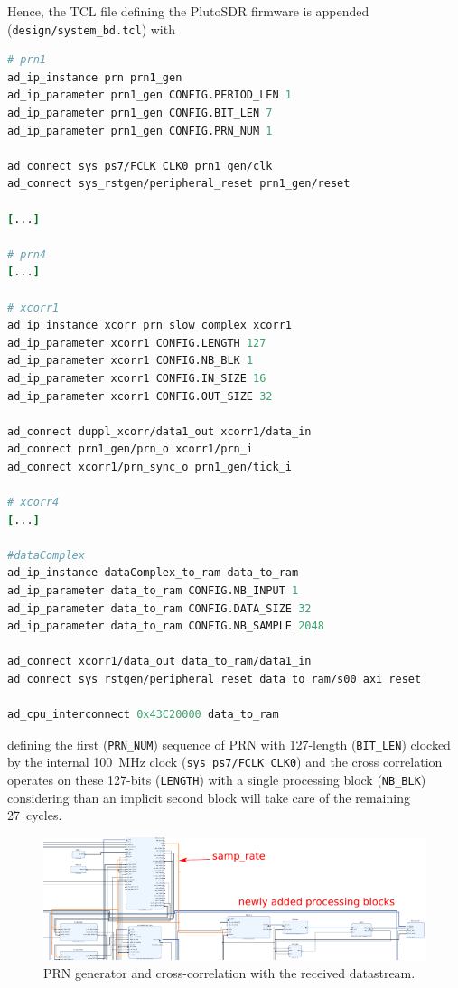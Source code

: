 \documentclass{article}
\begin{document}
Hence, the TCL file defining the PlutoSDR firmware is appended ({\tt design/system\_bd.tcl}) with
\begin{lstlisting}[language=TCL]
# prn1
ad_ip_instance prn prn1_gen
ad_ip_parameter prn1_gen CONFIG.PERIOD_LEN 1
ad_ip_parameter prn1_gen CONFIG.BIT_LEN 7
ad_ip_parameter prn1_gen CONFIG.PRN_NUM 1

ad_connect sys_ps7/FCLK_CLK0 prn1_gen/clk
ad_connect sys_rstgen/peripheral_reset prn1_gen/reset

[...]

# prn4
[...]

# xcorr1
ad_ip_instance xcorr_prn_slow_complex xcorr1
ad_ip_parameter xcorr1 CONFIG.LENGTH 127
ad_ip_parameter xcorr1 CONFIG.NB_BLK 1
ad_ip_parameter xcorr1 CONFIG.IN_SIZE 16
ad_ip_parameter xcorr1 CONFIG.OUT_SIZE 32

ad_connect duppl_xcorr/data1_out xcorr1/data_in
ad_connect prn1_gen/prn_o xcorr1/prn_i
ad_connect xcorr1/prn_sync_o prn1_gen/tick_i

# xcorr4
[...]

#dataComplex
ad_ip_instance dataComplex_to_ram data_to_ram
ad_ip_parameter data_to_ram CONFIG.NB_INPUT 1
ad_ip_parameter data_to_ram CONFIG.DATA_SIZE 32
ad_ip_parameter data_to_ram CONFIG.NB_SAMPLE 2048

ad_connect xcorr1/data_out data_to_ram/data1_in
ad_connect sys_rstgen/peripheral_reset data_to_ram/s00_axi_reset

ad_cpu_interconnect 0x43C20000 data_to_ram
\end{lstlisting}
defining the first ({\tt PRN\_NUM}) sequence of PRN with 127-length ({\tt BIT\_LEN}) clocked
by the internal 100~MHz clock ({\tt sys\_ps7/FCLK\_CLK0}) and the cross correlation
operates on these 127-bits ({\tt LENGTH}) with a single processing block ({\tt NB\_BLK}) considering
than an implicit second block will take care of the remaining 27~cycles.

\begin{figure}[h!tb]
\includegraphics[width=\linewidth]{1xcorr_1PRN_crop.pdf}
\caption{PRN generator and cross-correlation with the received datastream.}
\label{ex1}
\end{figure}
\end{document}
